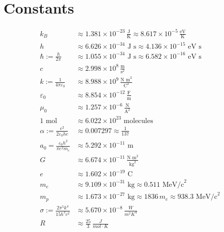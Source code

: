\documentclass[12pt]{article}
\begin{document}
\section{Constants}
\begin{align*}
    k_B &\approx 1.381 \times 10^{-23} \, \frac{\text{J}}{\text{K}} \approx 8.617 \times 10^{-5} \, \frac{\text{eV}}{\text{K}} \\
    h &\approx 6.626 \times 10^{-34} \text{ J s} \approx 4.136 \times 10^{-15} \text{ eV s} \\
\hbar := \frac{h}{2 \pi} &\approx 1.055 \times 10^{-34} \text{ J s} \approx 6.582 \times 10^{-16} \text{ eV s} \\
    c &\approx 2.998 \times 10^8 \, \frac{\text{m}}{\text{s}^2} \\
    k := \frac{1}{4 \pi \varepsilon_0} &\approx 8.988 \times 10^9 \, \frac{\text{N m}^2}{\text{C}^2} \\
    \varepsilon_0 &\approx 8.854 \times 10^{-12} \, \frac{\text{F}}{\text{m}} \\
    \mu_0 &\approx 1.257 \times 10^{-6} \, \frac{\text{N}}{\text{A}^2} \\
    1 \text{ mol} &\approx 6.022 \times 10^{23} \text{ molecules} \\
    \alpha := \frac{e^2}{2 \varepsilon_0 h c} &\approx 0.007297 \approx \frac{1}{137} \\
    a_0 = \frac{\varepsilon_0 h^2}{\pi e^2 m_e} &\approx 5.292 \times 10^{-11} \text{ m} \\
    G &\approx 6.674 \times 10^{-11} \, \frac{\text{N m}^2}{\text{kg}^2} \\
    e &\approx 1.602 \times 10^{-19} \text{ C} \\
    m_e &\approx 9.109 \times 10^{-31} \text{ kg} \approx 0.511 \text{ MeV/c}^2 \\
    m_p &\approx 1.673 \times 10^{-27} \text{ kg} \approx 1836 \, m_e \approx 938.3 \text{ MeV/c}^2 \\
    \sigma := \frac{2 \pi^5 k^4}{15 h^3 c^2} &\approx 5.670 \times 10^{-8} \, \frac{W}{m^2K^4} \\
    R &\approx \frac{25}{3} \, \frac{J}{mol \cdot K} \\
\end{align*}
\end{document}
